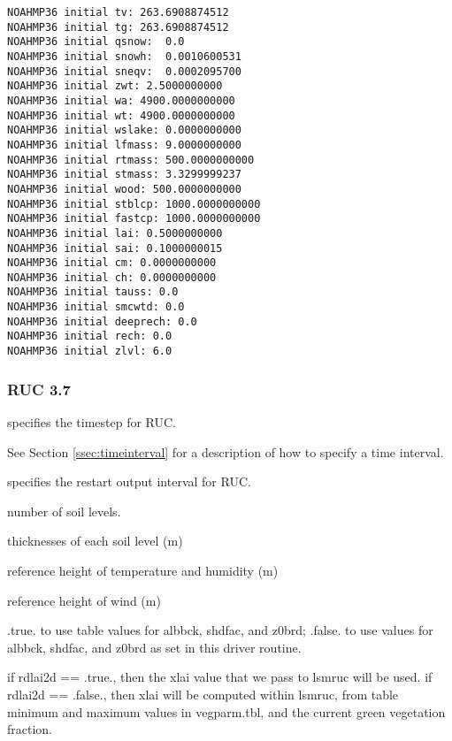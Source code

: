 \begin{Verbatim}[frame=single]
NOAHMP36 initial tv: 263.6908874512    
NOAHMP36 initial tg: 263.6908874512    
NOAHMP36 initial qsnow:  0.0    
NOAHMP36 initial snowh:  0.0010600531    
NOAHMP36 initial sneqv:  0.0002095700    
NOAHMP36 initial zwt: 2.5000000000    
NOAHMP36 initial wa: 4900.0000000000    
NOAHMP36 initial wt: 4900.0000000000    
NOAHMP36 initial wslake: 0.0000000000    
NOAHMP36 initial lfmass: 9.0000000000    
NOAHMP36 initial rtmass: 500.0000000000    
NOAHMP36 initial stmass: 3.3299999237    
NOAHMP36 initial wood: 500.0000000000    
NOAHMP36 initial stblcp: 1000.0000000000    
NOAHMP36 initial fastcp: 1000.0000000000    
NOAHMP36 initial lai: 0.5000000000    
NOAHMP36 initial sai: 0.1000000015    
NOAHMP36 initial cm: 0.0000000000    
NOAHMP36 initial ch: 0.0000000000    
NOAHMP36 initial tauss: 0.0    
NOAHMP36 initial smcwtd: 0.0 
NOAHMP36 initial deeprech: 0.0    
NOAHMP36 initial rech: 0.0    
NOAHMP36 initial zlvl: 6.0  
 \end{Verbatim}


 
 
 \subsubsection{RUC 3.7} \label{sssec:lsm_ruc37}
 

 
  specifies the timestep for RUC.

 See Section \ref{ssec:timeinterval} for a description
 of how to specify a time interval.

  specifies the restart output
 interval for RUC.

  number of soil levels.

  thicknesses of each soil level (m)

  reference height of temperature and humidity (m) 

  reference height of wind (m)

  .true. to use table values for
 albbck, shdfac, and z0brd; .false. to use values for albbck, shdfac,
 and z0brd as set in this driver routine.

  if rdlai2d == .true., then the xlai value
 that we pass to lsmruc will be used. if rdlai2d == .false., then xlai
 will be computed within lsmruc, from table minimum and maximum values
 in vegparm.tbl, and the current green vegetation fraction.

